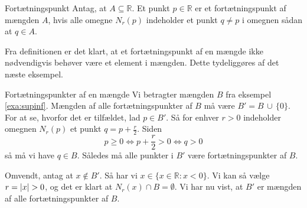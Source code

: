 \begin{definition}[label=def:fortætningspunkt]{Fortætningspunkt}{}
  Antag, at $A \subseteq \mathbb{R}$.
  Et punkt $p \in \mathbb{R}$ er et fortætningspunkt af mængden $A$, hvis alle omegne $N_r(p)$ indeholder et punkt $q \neq p$ i omegnen sådan at $q \in A$. 
\end{definition}

Fra definitionen er det klart, at et fortætningspunkt af en mængde ikke nødvendigvis behøver være et element i mængden.
Dette tydeliggøres af det næste eksempel.

\begin{example}[label=exa:]{Fortætningspunkter af en mængde}{}
  Vi betragter mængden $B$ fra eksempel \ref{exa:supinf}. 
  Mængden af alle fortætningspunkter af $B$ må være $B'=B\, \cup\, \{ 0 \} $. 
For at se, hvorfor det er tilfældet, lad $p \in B'$.
  Så for enhver $r>0$ indeholder omegnen $N_r(p)$ et punkt $q=p+\frac{r}{2}$.
  Siden 
  \[
  p \geq 0 \iff p + \frac{r}{2} > 0 \iff q>0
  \] 
  så må vi have $q \in B$.
  Således må alle punkter i $B'$ være fortætningspunkter af $B$. 

  Omvendt, antag at $x \not\in B'$.
  Så har vi $x \in \{ x \in \mathbb{R}: x < 0 \} $.
  Vi kan så vælge $r=\abs{x} >0$, og det er klart at $N_r(x) \cap B = \emptyset$.
  Vi har nu vist, at $B'$ er mængden af alle fortætningspunkter af $B$.
\end{example}



